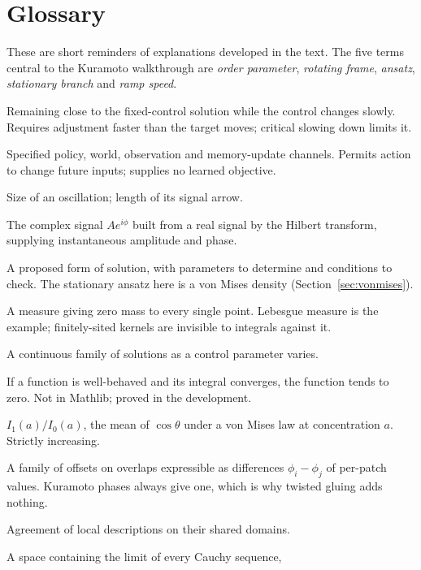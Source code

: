 \documentclass[11pt]{article}
\begin{document}
\section{Glossary}

These are short reminders of explanations developed in the text. The five
terms central to the Kuramoto walkthrough are \emph{order parameter},
\emph{rotating frame}, \emph{ansatz}, \emph{stationary branch} and
\emph{ramp speed}.

\begin{description}[leftmargin=1.6cm,style=nextline]
\item[Adiabatic tracking] Remaining close to the fixed-control solution while
the control changes slowly. Requires adjustment faster than the target moves;
critical slowing down limits it.
\item[Agency model] Specified policy, world, observation and memory-update
channels. Permits action to change future inputs; supplies no learned objective.
\item[Amplitude] Size of an oscillation; length of its signal arrow.
\item[Analytic signal] The complex signal $A e^{i\phi}$ built from a real
signal by the Hilbert transform, supplying instantaneous amplitude and phase.
\item[Ansatz] A proposed form of solution, with parameters to determine and
conditions to check. The stationary ansatz here is a von Mises density
(Section~\ref{sec:vonmises}).
\item[Atomless measure] A measure giving zero mass to every single point.
Lebesgue measure is the example; finitely-sited kernels are invisible to
integrals against it.
\item[Branch] A continuous family of solutions as a control parameter varies.
\item[Barbalat's lemma] If a function is well-behaved and its integral
converges, the function tends to zero. Not in Mathlib; proved in the
development.
\item[Bessel ratio $R(a)$] $I_1(a)/I_0(a)$, the mean of $\cos\theta$ under a von
Mises law at concentration $a$. Strictly increasing.
\item[Coboundary] A family of offsets on overlaps expressible as differences
$\phi_i-\phi_j$ of per-patch values. Kuramoto phases always give one, which is
why twisted gluing adds nothing.
\item[Compatibility] Agreement of local descriptions on their shared domains.
\item[Complete space] A space containing the limit of every Cauchy sequence,

\end{description}
\end{document}
